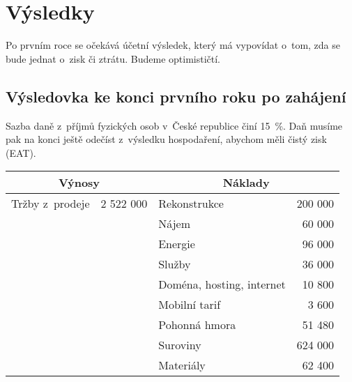 \section{Výsledky}

Po prvním roce se očekává účetní výsledek, který má vypovídat o~tom, zda se bude jednat o~zisk či ztrátu. Budeme optimističtí.

\subsection{Výsledovka ke konci prvního roku po zahájení}
Sazba daně z~příjmů fyzických osob v~České republice činí 15~\%. Daň musíme pak na konci ještě odečíst z~výsledku hospodaření, abychom měli čistý zisk (EAT).

\begin{table}[htbp]
\begin{center}
\begin{tabular}{lllr}
\multicolumn{2}{c}{\textbf{Výnosy}\index{výnos}}                    & \multicolumn{2}{c}{\textbf{Náklady\index{náklad}}}                \\ \hline
Tržby z~prodeje        & \multicolumn{1}{r}{2 522 000} & Rekonstrukce                   & 200 000            \\
                       & \multicolumn{1}{r}{}          & Nájem                          & 60 000             \\
                       &                               & Energie                        & 96 000             \\
                       &                               & Služby                         & 36 000             \\
                       &                               & Doména, hosting, internet      & 10 800             \\
                       &                               & Mobilní tarif                  & 3 600              \\
                       &                               & Pohonná hmora                  & 51 480             \\
                       &                               & Suroviny                       & 624 000            \\
                       &                               & Materiály                      & 62 400             \\

\end{tabular}
\end{center}
\end{table}
